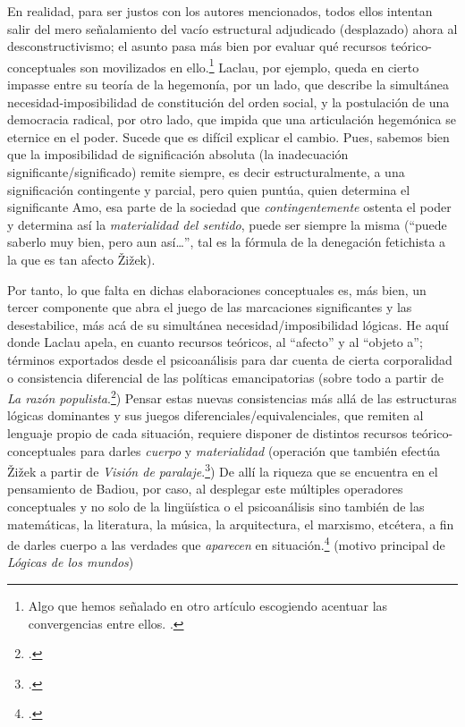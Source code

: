 En realidad, para ser justos con los autores mencionados, todos ellos intentan salir del mero señalamiento del vacío estructural adjudicado (desplazado) ahora al desconstructivismo; el asunto pasa más bien por evaluar qué recursos teórico-conceptuales son movilizados en ello.\footnote{Algo que hemos señalado en otro artículo escogiendo acentuar las convergencias entre ellos. \cite[Véase][]{@7146-FARRAN2009}.} Laclau, por ejemplo, queda en cierto impasse entre su teoría de la hegemonía, por un lado, que describe la simultánea necesidad-imposibilidad de constitución del orden social, y la postulación de una democracia radical, por otro lado, que impida que una articulación hegemónica se eternice en el poder. Sucede que es difícil explicar el cambio. Pues, sabemos bien que la imposibilidad de significación absoluta (la inadecuación significante/significado) remite siempre, es decir estructuralmente, a una significación contingente y parcial, pero quien puntúa, quien determina el significante Amo, esa parte de la sociedad que \emph{contingentemente} ostenta el poder y determina así la \emph{materialidad del sentido}, puede ser siempre la misma (\enquote{puede saberlo muy bien, pero aun así\ldots}, tal es la fórmula de la denegación fetichista a la que es tan afecto Žižek).

Por tanto, lo que falta en dichas elaboraciones conceptuales es, más bien, un tercer componente que abra el juego de las marcaciones significantes y las desestabilice, más acá de su simultánea necesidad/imposibilidad lógicas. He aquí donde Laclau apela, en cuanto recursos teóricos, al \enquote{afecto} y al \enquote{objeto a}; términos exportados desde el psicoanálisis para dar cuenta de cierta corporalidad o consistencia diferencial de las políticas emancipatorias (sobre todo a partir de \emph{La razón populista}.\footcite{@7021-LACLAU2007}) Pensar estas nuevas consistencias más allá de las estructuras lógicas dominantes y sus juegos diferenciales/equivalenciales, que remiten al lenguaje propio de cada situación, requiere disponer de distintos recursos teórico-conceptuales para darles \emph{cuerpo} y \emph{materialidad} (operación que también efectúa Žižek a partir de \emph{Visión de paralaje}.\footcite{@7020-ZIZEK2006}) De allí la riqueza que se encuentra en el pensamiento de Badiou, por caso, al desplegar este múltiples operadores conceptuales y no solo de la lingüística o el psicoanálisis sino también de las matemáticas, la literatura, la música, la arquitectura, el marxismo, etcétera, a fin de darles cuerpo a las verdades que \emph{aparecen} en situación.\footcite{@7019-BADIOU2008} (motivo principal de \emph{Lógicas de los mundos})


